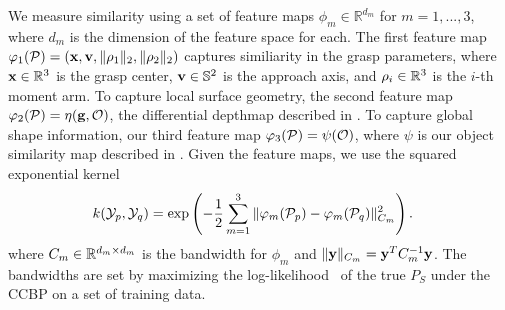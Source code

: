 We measure similarity using a set of feature maps $\phi_m \in \mathbb{R}^{d_m}$ for $m = 1, ..., 3$, where $d_m$ is the dimension of the feature space for each.
The first feature map $\varphi_{1}(\mathcal{P}) = (\mathbf{x}, \mathbf{v}, \| \rho_1 \|_2, \| \rho_2 \|_2)$ captures similiarity in the grasp parameters, where $\mathbf{x} \in \mathbb{R}^3$ is the grasp center, $\mathbf{v} \in \mathbb{S}^2$ is the approach axis, and $\rho_i \in \mathbb{R}^3$ is the $i$-th moment arm.
To capture local surface geometry, the second feature map $\varphi_{2}(\mathcal{P}) = \eta(\mathbf{g}, \mathcal{O})$, the differential depthmap described in .
To capture global shape information, our third feature map $\varphi_{3}(\mathcal{P}) = \psi(\mathcal{O})$, where $\psi$ is our object similarity map described in .
Given the feature maps, we use the squared exponential kernel 
\begin{align*}
	k(\mathcal{Y}_p, \mathcal{Y}_q) &= \exp\left( - \frac{1}{2} \sum \limits_{m=1}^{3} \|\varphi_m(\mathcal{P}_p) - \varphi_m(\mathcal{P}_q)\|_{C_m}^2 \right).
\end{align*}
\noindent where $C_m \in \mathbb{R}^{d_m \times d_m}$ is the bandwidth for $\phi_m$ and $\| \mathbf{y} \|_{C_m} = \mathbf{y}^T C_m^{-1} \mathbf{y}$.
The bandwidths are set by maximizing the log-likelihood~\cite{goetschalckx2011continuous} of the true $P_S$ under the CCBP on a set of training data.





